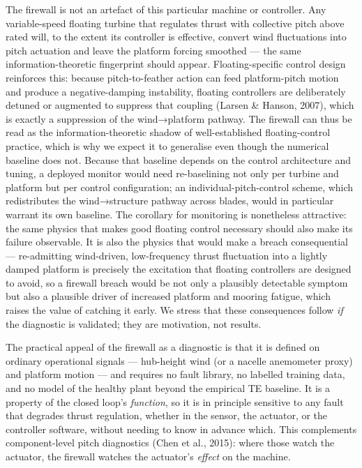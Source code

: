 \documentclass[
  english,
  11pt,
]{article}
\begin{document}
The firewall is not an artefact of this particular machine or
controller. Any variable-speed floating turbine that regulates thrust
with collective pitch above rated will, to the extent its controller is
effective, convert wind fluctuations into pitch actuation and leave the
platform forcing smoothed --- the same information-theoretic fingerprint
should appear. Floating-specific control design reinforces this: because
pitch-to-feather action can feed platform-pitch motion and produce a
negative-damping instability, floating controllers are deliberately
detuned or augmented to suppress that coupling (Larsen \& Hanson, 2007),
which is exactly a suppression of the wind→platform pathway. The
firewall can thus be read as the information-theoretic shadow of
well-established floating-control practice, which is why we expect it to
generalise even though the numerical baseline does not. Because that
baseline depends on the control architecture and tuning, a deployed
monitor would need re-baselining not only per turbine and platform but
per control configuration; an individual-pitch-control scheme, which
redistributes the wind→structure pathway across blades, would in
particular warrant its own baseline. The corollary for monitoring is
nonetheless attractive: the same physics that makes good floating
control necessary should also make its failure observable. It is also
the physics that would make a breach consequential --- re-admitting
wind-driven, low-frequency thrust fluctuation into a lightly damped
platform is precisely the excitation that floating controllers are
designed to avoid, so a firewall breach would be not only a plausibly
detectable symptom but also a plausible driver of increased platform and
mooring fatigue, which raises the value of catching it early. We stress
that these consequences follow \emph{if} the diagnostic is validated;
they are motivation, not results.

The practical appeal of the firewall as a diagnostic is that it is
defined on ordinary operational signals --- hub-height wind (or a
nacelle anemometer proxy) and platform motion --- and requires no fault
library, no labelled training data, and no model of the healthy plant
beyond the empirical TE baseline. It is a property of the closed loop's
\emph{function}, so it is in principle sensitive to any fault that
degrades thrust regulation, whether in the sensor, the actuator, or the
controller software, without needing to know in advance which. This
complements component-level pitch diagnostics (Chen et al., 2015): where
those watch the actuator, the firewall watches the actuator's
\emph{effect} on the machine.
\end{document}

